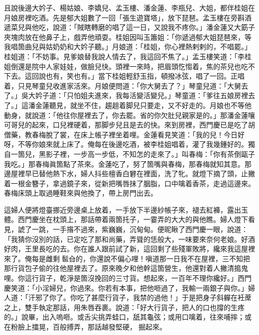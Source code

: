 且說後邊大妗子、楊姑娘、李嬌兒、孟玉樓、潘金蓮、李瓶兒、大姐，都伴桂姐在月娘房裡吃酒。先是郁大姐數了一回「張生遊寶塔」，放下琵琶。孟玉樓在旁斟酒遞菜兒與他吃，說道：「賊瞎轉磨的唱了這一日，又說我不疼你。」潘金蓮又大筯子夾塊肉放在他鼻子上，戲弄他頑耍。桂姐因叫玉簫姐：「你遞過郁大姐琵琶來，等我唱箇曲兒與姑奶奶和大妗子聽。」月娘道：「桂姐，你心裡熱剌剌的，不唱罷。」桂姐道：「不妨事。見爹娘替我說人情去了，我這回不焦了。」孟玉樓笑道：「李桂姐倒還是院中人家娃娃，做臉兒快。頭裡一來時，把眉頭忔㥮着，焦的茶兒也吃不下去。{}這回說也有，笑也有。」當下桂姐輕舒玉指，頓撥冰弦，唱了一回。正唱着，只見琴童兒收進家活來。月娘便問道：「你大舅去了？」琴童兒道：「大舅去了。」吳大妗子道：「只怕姐夫進來，我每活變活變兒。」琴童道：「爹往五娘房裡去了。」這潘金蓮聽見，就坐不住，趨趄着脚兒只要走，又不好走的。{}月娘也不等他動身，就說道：「他往你屋裡去了，你去罷。省的你欠肚兒親家是的。」{}那潘金蓮嚷可哥兒的起來，口兒裡硬着，那脚步兒且是去的快。來到房裡，西門慶已是吃了胡僧藥，教春梅脫了裳，在床上帳子裡坐着哩。金蓮看見笑道：「我的兒！今日好呀，不等你娘來就上床了。俺每在後邊吃酒，被李桂姐唱着，灌了我幾鍾好的。獨自一箇兒，黑影子裡，一步高一步低，不知怎的走來了。」{}叫春梅：「你有茶倒甌子我吃。」那春梅眞箇點了茶來。金蓮吃了，努了箇嘴與春梅，那春梅就知其意。{}那邊屋裡早已替他熱下水，婦人抖些檀香白礬在裡面，{}洗了牝。就燈下摘了頭，止撇着一根金簪子，拿過鏡子來，從新把嘴唇抹了胭脂，口中噙着香茶，走過這邊來。春梅床頭上取過睡鞋來與他換了，帶上房門出去。

這婦人便將燈臺挪近旁邊桌上放着，一手放下半邊紗帳子來，褪去紅褲，露出玉體。西門慶坐在枕頭上，那話帶着兩箇托子，一霎弄的大大的與他瞧。婦人燈下看見，諕了一跳，一手揝不過來，紫巍巍，沉甸甸。便昵瞅了西門慶一眼，說道：「我猜你沒別的話，已定吃了那和尚藥，{}弄聳的恁般大，一味要來奈何老娘。好酒好肉，王里長吃的去。你在誰人跟前試了新，這回剩了些殘軍敗將，{}纔來我這屋裡來了。俺每是雌剩𩫻䯲㒲的，你還說不偏心哩！嗔道那一日我不在屋裡，三不知把那行貨包子偷的往他屋裡去了。原來晚夕和他幹這箇營生，他還對着人撇清搗鬼哩。你這行貨子，乾淨是箇沒挽回的三寸貨。想起來，一百年不理你纔好。」西門慶笑道：「小淫婦兒，你過來。你若有本事，把他咂過了，我輸一兩銀子與你。」婦人道：「汗邪了你了。你吃了甚麼行貨子，我禁的過他！」于是把身子斜軃在衽蓆之上，雙手執定那話，用朱唇吞裹。說道：「好大行貨子，把人的口也撐的生疼的。」說畢，出入嗚咂。或舌尖挑弄蛙口，舐其龜弦；或用口噙着，往來哺摔；或在粉臉上擂晃，百般搏弄，那話越發堅硬，𢳥掘起來。

